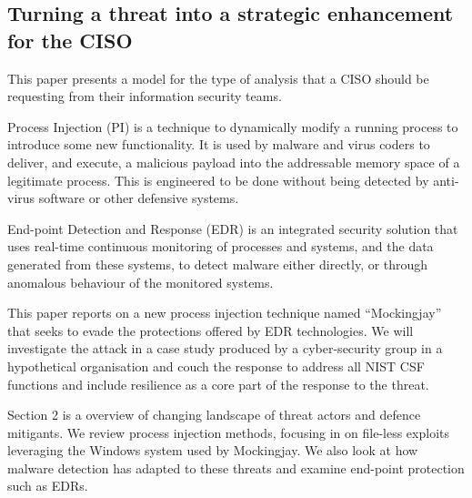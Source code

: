 

\subsection{Turning a threat into a strategic enhancement for the CISO}

This paper presents a model for the type of analysis that a CISO should be requesting from their information security teams.

Process Injection (PI) is a technique to dynamically modify a running process to introduce some new functionality.  It is used by malware and virus coders to
deliver, and execute, a malicious payload into the addressable memory space of a legitimate process.  This is engineered to be done without
being detected by anti-virus software or other defensive systems. 

End-point Detection and Response (EDR) is an integrated security solution that uses real-time continuous monitoring of processes and systems, and the data generated from these systems, to detect malware either directly, or through anomalous behaviour of the monitored systems.

This paper reports on a new process injection technique named ``Mockingjay'' \autocite{Peixoto:2023} that seeks to evade the protections offered by EDR technologies.  We will investigate the attack in a case study produced by a cyber-security group in a hypothetical organisation and couch the response
to address all NIST CSF functions and include resilience as a core part of the response to the threat.



Section 2 is a overview of changing landscape of threat actors and defence mitigants.  We review process injection methods, focusing in on file-less exploits leveraging the Windows system used by Mockingjay.  We also look at how malware detection has adapted to these threats and examine end-point protection such as EDRs.


